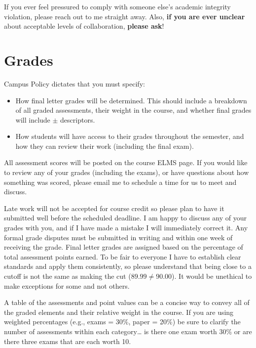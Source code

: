 \documentclass[11pt]{article}
\def\tightlist{}
\begin{document}
If you ever feel pressured to comply with someone else's academic
integrity violation, please reach out to me straight away. Also,
\textbf{if you are ever unclear} about acceptable levels of
collaboration, \textbf{please ask}!

\hypertarget{grades}{%
\section{Grades}\label{grades}}

Campus Policy dictates that you must specify:

\begin{itemize}
\tightlist
\item
  How final letter grades will be determined. This should include a
  breakdown of all graded assessments, their weight in the course, and
  whether final grades will include \(\pm\) descriptors.
\item
  How students will have access to their grades throughout the semester,
  and how they can review their work (including the final exam).
\end{itemize}

All assessment scores will be posted on the course ELMS page. If you
would like to review any of your grades (including the exams), or have
questions about how something was scored, please email me to schedule a
time for us to meet and discuss.

Late work will not be accepted for course credit so please plan to have
it submitted well before the scheduled deadline. I am happy to discuss
any of your grades with you, and if I have made a mistake I will
immediately correct it. Any formal grade disputes must be submitted in
writing and within one week of receiving the grade. Final letter grades
are assigned based on the percentage of total assessment points earned.
To be fair to everyone I have to establish clear standards and apply
them consistently, so please understand that being close to a cutoff is
not the same as making the cut (\(89.99 \neq 90.00\)). It would be
unethical to make exceptions for some and not others.

A table of the assessments and point values can be a concise way to
convey all of the graded elements and their relative weight in the
course. If you are using weighted percentages (e.g., exams = 30\%, paper
= 20\%) be sure to clarify the number of assessments within each
category\ldots{} is there one exam worth 30\% or are there three exams
that are each worth 10.
\end{document}
